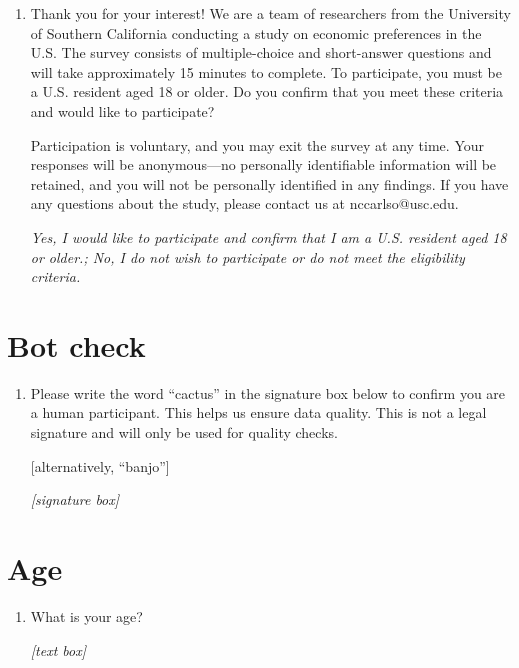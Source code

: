 \documentclass[11pt, headsepline]{article}
\begin{document}
\begin{enumerate}
    \item Thank you for your interest! We are a team of researchers from the University of Southern California conducting a study on economic preferences in the U.S. 
    The survey consists of multiple-choice and short-answer questions and will take approximately 15 minutes to complete.
    To participate, you must be a U.S. resident aged 18 or older. Do you confirm that you meet these criteria and would like to participate?

    Participation is voluntary, and you may exit the survey at any time. Your responses will be anonymous---no personally identifiable information will be retained, and you will not be personally identified in any findings. If you have any questions about the study, please contact us at nccarlso@usc.edu.

    \textit{Yes, I would like to participate and confirm that I am a U.S. resident aged 18 or older.; No, I do not wish to participate or do not meet the eligibility criteria.}
\end{enumerate}

\section*{Bot check}

\begin{enumerate}[resume]

    \item Please write the word “cactus” in the signature box below to confirm you are a human participant. This helps us ensure data quality. This is not a legal signature and will only be used for quality checks.

    [alternatively, ``banjo'']

    \textit{[signature box]}

\end{enumerate}

\section*{Age}

\begin{enumerate}[resume]

    \item What is your age?

    \textit{[text box]}

\end{enumerate}
\end{document}
